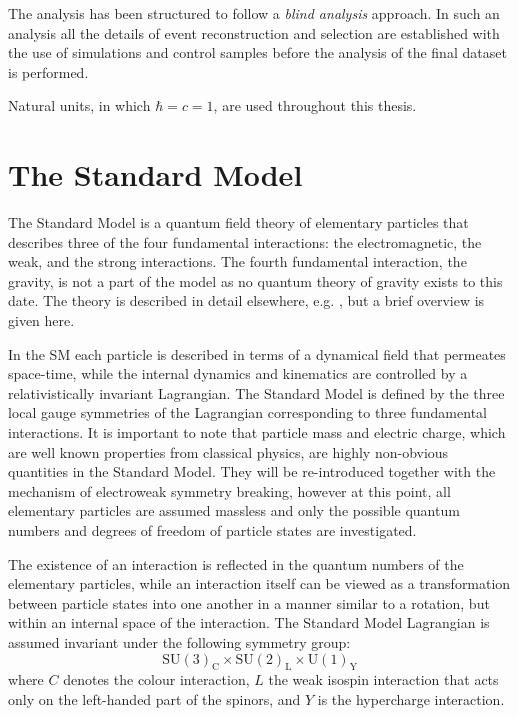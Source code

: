 The analysis has been structured to follow a {\it blind analysis} approach. In such an analysis
all the details of event reconstruction and selection are established 
with the use of simulations and control samples before
the analysis of the final dataset is performed.

Natural units, in which $\hbar=c=1$, are used throughout this thesis.


\section{The Standard Model}

The Standard Model is a quantum field theory of elementary particles that describes 
three of the four fundamental interactions: 
the electromagnetic, the weak, and the strong interactions. The fourth fundamental
interaction, the gravity, 
is not a part of the model as no quantum theory of gravity exists to this date. 
The theory is described in detail elsewhere, e.g. \cite{Glashow:1961tr,Salam:1968rm,Tully:1417476}, 
but a brief overview is given here.

In the SM each particle is described
in terms of a dynamical field that permeates space-time, while the internal dynamics 
and kinematics are controlled by a relativistically invariant Lagrangian.
The Standard Model is defined by the three local gauge symmetries of the Lagrangian
corresponding to three fundamental interactions.
It is important to note that particle mass and electric charge, 
which are well known properties from 
classical physics, are highly non-obvious quantities in the Standard Model. They
will be re-introduced together with the mechanism of electroweak symmetry breaking, however
at this point,
all elementary particles are assumed massless and only the possible quantum numbers
and degrees of freedom of particle states are investigated.

The existence of an interaction is reflected in the quantum numbers of the elementary
particles, while an interaction itself can be viewed as a transformation between particle states
into one another in a manner similar to a rotation, but within an internal space of the interaction.
The Standard Model Lagrangian is assumed invariant under the following symmetry group:
\begin{equation}
\text{SU}(3)_\text{C} \times \text{SU}(2)_\text{L} \times \text{U}(1)_\text{Y}
\label{eqn:symSM}
\end{equation}
where $C$ denotes the colour interaction, $L$ the weak isospin interaction 
that acts only on the left-handed part of the spinors, and $Y$ is the hypercharge
interaction.

